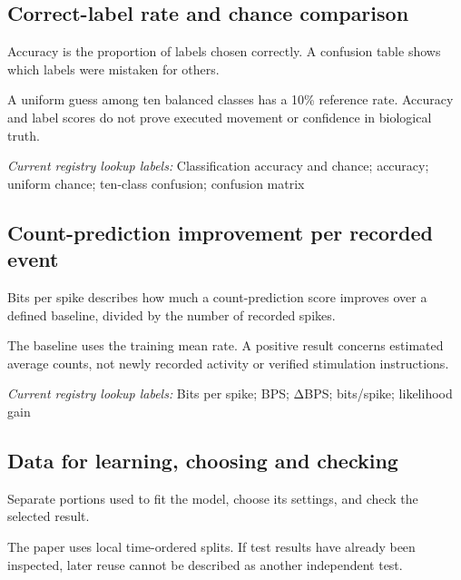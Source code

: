 \begin{samepage}
\subsection*{Correct-label rate and chance comparison}
\noindent Accuracy is the proportion of labels chosen correctly. A confusion table shows which labels were mistaken for others.\par
\end{samepage}
\begin{samepage}
\noindent A uniform guess among ten balanced classes has a 10\% reference rate. Accuracy and label scores do not prove executed movement or confidence in biological truth.\par\nopagebreak[4]

\end{samepage}


\noindent\textit{Current registry lookup labels:} Classification accuracy and chance; accuracy; uniform chance; ten-class confusion; confusion matrix\par

\begin{samepage}
\subsection*{Count-prediction improvement per recorded event}
\noindent Bits per spike describes how much a count-prediction score improves over a defined baseline, divided by the number of recorded spikes.\par
\end{samepage}
\begin{samepage}
\noindent The baseline uses the training mean rate. A positive result concerns estimated average counts, not newly recorded activity or verified stimulation instructions.\par\nopagebreak[4]

\end{samepage}


\noindent\textit{Current registry lookup labels:} Bits per spike; BPS; ΔBPS; bits/spike; likelihood gain\par

\begin{samepage}
\subsection*{Data for learning, choosing and checking}
\noindent Separate portions used to fit the model, choose its settings, and check the selected result.\par
\end{samepage}
\begin{samepage}
\noindent The paper uses local time-ordered splits. If test results have already been inspected, later reuse cannot be described as another independent test.\par\nopagebreak[4]

\end{samepage}



